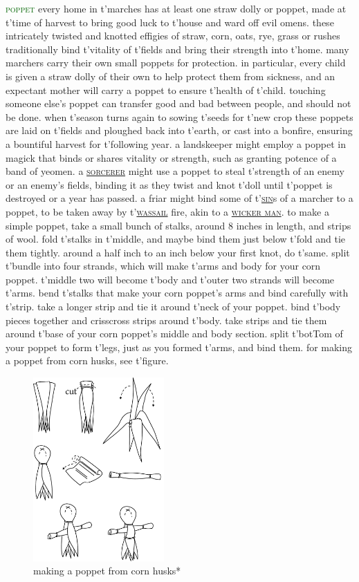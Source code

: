 \documentclass[twoside,11pt,b5paper,twocolumn]{scrbook}
\newcommand{\estcab}[1]{\textsc{\textcolor{marron}{#1}}}
\newcommand{\keyword}[1]{\textcolor{darkgreen}{#1}}
\renewcommand{\paragraph}[1]{\par\noindent\markboth{#1}{#1}\estcab{\keyword{#1}}\label{#1} }
\newcommand{\see}[1]{{\estcab{\hyperref[#1]{#1}}}}
\begin{document}
\paragraph{poppet} every home in t'marches has at least one straw dolly or poppet, made at t'time of harvest to bring good luck to t'house and ward off evil omens. these intricately twisted and knotted effigies of straw, corn, oats, rye, grass or rushes traditionally bind t'vitality of t'fields and bring their strength into t'home. many marchers carry their own small poppets for protection. in particular, every child is given a straw dolly of their own to help protect them from sickness, and an expectant mother will carry a poppet to ensure t'health of t'child. touching someone else’s poppet can transfer good and bad between people, and should not be done. when t'season turns again to sowing t'seeds for t'new crop these poppets are laid on t'fields and ploughed back into t'earth, or cast into a bonfire, ensuring a bountiful harvest for t'following year. a landskeeper might employ a poppet in magick that binds or shares vitality or strength, such as granting potence of a band of yeomen. a \see{sorcerer} might use a poppet to steal t'strength of an enemy or an enemy's fields, binding it as they twist and knot t'doll until t'poppet is destroyed or a year has passed. a friar might bind some of t'\see{sin}s of a marcher to a poppet, to be taken away by t'\see{wassail} fire, akin to a \see{wicker man}. to make a simple poppet, take a small bunch of stalks, around 8 inches in length, and strips of wool. fold t'stalks in t'middle, and maybe bind them just below t'fold and tie them tightly. around a half inch to an inch below your first knot, do t'same. split t'bundle into four strands, which will make t'arms and body for your corn poppet. t'middle two will become t'body and t'outer two strands will become t'arms. bend t'stalks that make your corn poppet’s arms and bind carefully with t'strip. take a longer strip and tie it around t'neck of your poppet. bind t'body pieces together and crisscross strips around t'body. take strips and tie them around t'base of your corn poppet’s middle and body section. split t'botTom of your poppet to form t'legs, just as you formed t'arms, and bind them. for making a poppet from corn husks, see t'figure.\begin{figure}\centering\includegraphics[width=5cm]{encyclopedia/poppet}\caption{making a poppet from corn husks*}\end{figure}
\end{document}
